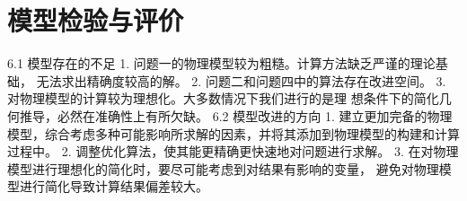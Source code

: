 \section{模型检验与评价}


6.1 模型存在的不足
1. 问题一的物理模型较为粗糙。计算方法缺乏严谨的理论基础，
无法求出精确度较高的解。
2. 问题二和问题四中的算法存在改进空间。
3. 对物理模型的计算较为理想化。大多数情况下我们进行的是理
想条件下的简化几何推导，必然在准确性上有所欠缺。
6.2 模型改进的方向
1. 建立更加完备的物理模型，综合考虑多种可能影响所求解的因素，并将其添加到物理模型的构建和计算过程中。
2. 调整优化算法，使其能更精确更快速地对问题进行求解。
3. 在对物理模型进行理想化的简化时，要尽可能考虑到对结果有影响的变量，
避免对物理模型进行简化导致计算结果偏差较大。